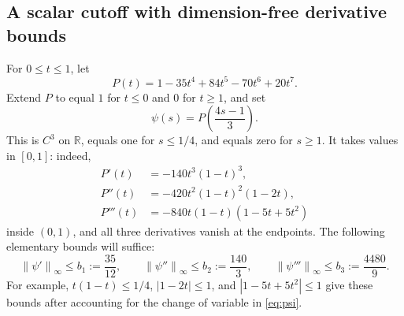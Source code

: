 \documentclass[11pt,a4paper]{article}
\newcommand{\R}{\mathbb R}
\newcommand{\norm}[1]{\left\lVert#1\right\rVert}
\theoremstyle{definition}
\theoremstyle{remark}
\begin{document}
\subsection{A scalar cutoff with dimension-free derivative bounds}
\label{sec:cutoff}
For $0\le t\le1$, let
\begin{equation}\label{eq:P}
 P(t)=1-35t^4+84t^5-70t^6+20t^7.
\end{equation}
Extend $P$ to equal $1$ for $t\le0$ and $0$ for $t\ge1$, and set
\begin{equation}\label{eq:psi}
 \psi(s)=P\left(\frac{4s-1}{3}\right).
\end{equation}
This is $C^3$ on $\R$, equals one for $s\le1/4$, and equals zero for $s\ge1$. It takes values in $[0,1]$: indeed,
\begin{align}
 P'(t)&=-140t^3(1-t)^3,\\
 P''(t)&=-420t^2(1-t)^2(1-2t),\\
 P'''(t)&=-840t(1-t)(1-5t+5t^2)
\end{align}
inside $(0,1)$, and all three derivatives vanish at the endpoints. The following elementary bounds will suffice:
\begin{equation}\label{eq:cutoff-bounds}
 \norm{\psi'}_\infty\le b_1:=\frac{35}{12},\qquad
 \norm{\psi''}_\infty\le b_2:=\frac{140}{3},\qquad
 \norm{\psi'''}_\infty\le b_3:=\frac{4480}{9}.
\end{equation}
For example, $t(1-t)\le1/4$, $|1-2t|\le1$, and $|1-5t+5t^2|\le1$ give these bounds after accounting for the change of variable in \eqref{eq:psi}.
\end{document}
